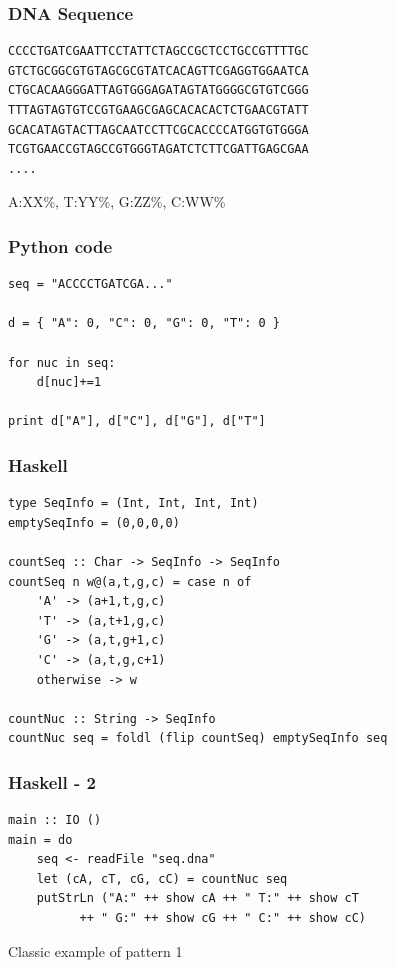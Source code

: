 \begin{frame}[fragile]\frametitle{DNA Sequence}

\begin{verbatim}
CCCCTGATCGAATTCCTATTCTAGCCGCTCCTGCCGTTTTGC
GTCTGCGGCGTGTAGCGCGTATCACAGTTCGAGGTGGAATCA
CTGCACAAGGGATTAGTGGGAGATAGTATGGGGCGTGTCGGG
TTTAGTAGTGTCCGTGAAGCGAGCACACACTCTGAACGTATT
GCACATAGTACTTAGCAATCCTTCGCACCCCATGGTGTGGGA
TCGTGAACCGTAGCCGTGGGTAGATCTCTTCGATTGAGCGAA
....
\end{verbatim}

A:XX\%, T:YY\%, G:ZZ\%, C:WW\%

\end{frame}

\begin{frame}[fragile]\frametitle{Python code}

\begin{verbatim}
seq = "ACCCCTGATCGA..."

d = { "A": 0, "C": 0, "G": 0, "T": 0 }

for nuc in seq:
    d[nuc]+=1

print d["A"], d["C"], d["G"], d["T"]
\end{verbatim}

\end{frame}

\begin{frame}[fragile]\frametitle{Haskell}

\begin{verbatim}
type SeqInfo = (Int, Int, Int, Int)
emptySeqInfo = (0,0,0,0)

countSeq :: Char -> SeqInfo -> SeqInfo
countSeq n w@(a,t,g,c) = case n of
    'A' -> (a+1,t,g,c)
    'T' -> (a,t+1,g,c)
    'G' -> (a,t,g+1,c)
    'C' -> (a,t,g,c+1)
    otherwise -> w

countNuc :: String -> SeqInfo
countNuc seq = foldl (flip countSeq) emptySeqInfo seq
\end{verbatim}

\end{frame}

\begin{frame}[fragile]\frametitle{Haskell - 2}

\begin{verbatim}
main :: IO ()
main = do
    seq <- readFile "seq.dna"
    let (cA, cT, cG, cC) = countNuc seq
    putStrLn ("A:" ++ show cA ++ " T:" ++ show cT
          ++ " G:" ++ show cG ++ " C:" ++ show cC)
\end{verbatim}

Classic example of pattern 1

\end{frame}

